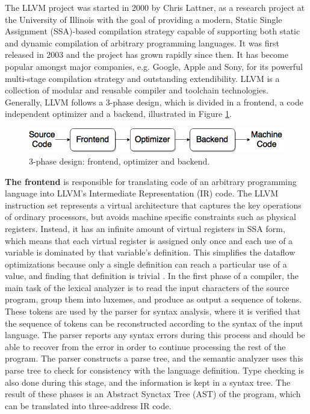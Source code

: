 The LLVM project was started in 2000 by Chris Lattner, as a research project at the University of Illinois with the goal of providing a modern, Static Single Assignment (SSA)-based compilation strategy capable of supporting both static and dynamic compilation of arbitrary programming languages. It was first released in 2003 and the project has grown rapidly since then. It has become popular amongst major companies, e.g. Google, Apple and Sony, for its powerful multi-stage compilation strategy and outstanding extendibility. LLVM is a collection of modular and reusable compiler and toolchain technologies. Generally, LLVM follows a 3-phase design, which is divided in a frontend, a code independent optimizer and a backend, illustrated in Figure \ref{fig:3phase_design}.

\begin{figure}[H]
\centering
\includegraphics[width=.7\textwidth]{figures/3phase_design}
\caption{3-phase design: frontend, optimizer and backend.}
\label{fig:3phase_design}
\end{figure}

\textbf{The frontend} is responsible for translating code of an arbitrary programming language into LLVM's Intermediate Representation (IR) code. The LLVM instruction set represents a virtual architecture that captures the key operations of ordinary processors, but avoids machine specific constraints such as physical registers. Instead, it has an infinite amount of virtual registers in SSA form, which means that each virtual register is assigned only once and each use of a variable is dominated by that variable's definition. This simplifies the dataflow optimizations because only a single definition can reach a particular use of a value, and finding that definition is trivial \cite{llvm_strategy}.
In the first phase of a compiler, the main task of the lexical analyzer is to read the input characters of the source program, group them into luxemes, and produce as output a sequence of tokens. These tokens are used by the parser for syntax analysis, where it is verified that the sequence of tokens can be reconstructed according to the syntax of the input language. The parser reports any syntax errors during this process and should be able to recover from the error in order to continue processing the rest of the program. The parser constructs a parse tree, and the semantic analyzer uses this parse tree to check for consistency with the language definition. Type checking is also done during this stage, and the information is kept in a syntax tree. The result of these phases is an Abstract Synctax Tree (AST) of the program, which can be translated into three-address IR code. %

